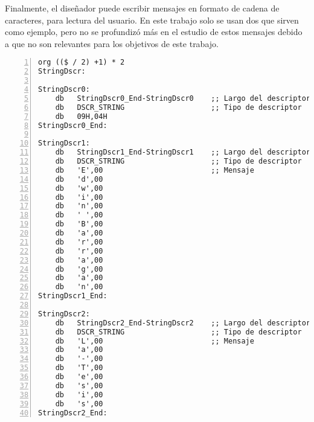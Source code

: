 	Finalmente, el diseñador puede escribir mensajes en formato de cadena de caracteres, para lectura del usuario. En este trabajo solo se usan dos que sirven como ejemplo, pero no se profundizó más en el estudio de estos mensajes debido a que no son relevantes para los objetivos de este trabajo.
	
	\begin{lstlisting}[language={[x86masm]Assembler},backgroundcolor=\color{gray!30},numbers=left]
org (($ / 2) +1) * 2	
StringDscr:
	
StringDscr0:
	db   StringDscr0_End-StringDscr0    ;; Largo del descriptor
	db   DSCR_STRING					;; Tipo de descriptor
	db   09H,04H
StringDscr0_End:
	
StringDscr1:
	db   StringDscr1_End-StringDscr1    ;; Largo del descriptor
	db   DSCR_STRING					;; Tipo de descriptor
	db   'E',00							;; Mensaje
	db   'd',00
	db   'w',00
	db   'i',00
	db   'n',00
	db   ' ',00
	db   'B',00
	db   'a',00	
	db   'r',00
	db   'r',00
	db   'a',00
	db   'g',00
	db   'a',00
	db   'n',00
StringDscr1_End:
	
StringDscr2:
	db   StringDscr2_End-StringDscr2    ;; Largo del descriptor
	db   DSCR_STRING					;; Tipo de descriptor
	db   'L',00							;; Mensaje
	db   'a',00
	db   '-',00
	db   'T',00
	db   'e',00
	db   's',00
	db   'i',00
	db   's',00
StringDscr2_End:
	\end{lstlisting}
	
	
%	

